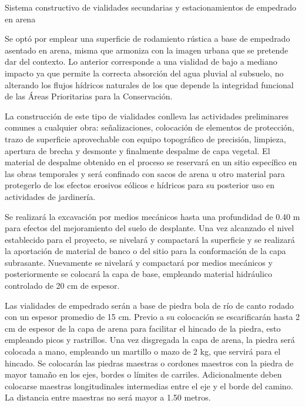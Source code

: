 \documentclass{article}
\begin{document}
\bigskip


\bigskip

Sistema constructivo de vialidades secundarias y estacionamientos de empedrado en arena


\bigskip

Se optó por emplear una superficie de rodamiento rústica a base de empedrado asentado en arena, misma que armoniza con la imagen urbana que se pretende dar del contexto. Lo anterior corresponde a una vialidad de bajo a mediano impacto ya que permite la correcta absorción del agua pluvial al subsuelo, no alterando los flujos hídricos naturales de los que depende la integridad funcional de las Áreas Prioritarias para la Conservación. 


\bigskip

La construcción de este tipo de vialidades conlleva las actividades preliminares comunes a cualquier obra: señalizaciones, colocación de elementos de protección, trazo de superficie aprovechable con equipo topográfico de precisión, limpieza, apertura de brecha y desmonte y finalmente despalme de capa vegetal. El material de despalme obtenido en el proceso se reservará en un sitio específico en las obras temporales y será confinado con sacos de arena u otro material para protegerlo de los efectos erosivos eólicos e hídricos para su posterior uso en actividades de jardinería.


\bigskip

Se realizará la excavación por medios mecánicos hasta una profundidad de 0.40 m para efectos del mejoramiento del suelo de desplante. Una vez alcanzado el nivel establecido para el proyecto, se nivelará y compactará la superficie y se realizará la aportación de material de banco o del sitio para la conformación de la capa subrasante. Nuevamente se nivelará y compactará por medios mecánicos y posteriormente se colocará la capa de base, empleando material hidráulico controlado de 20 cm de espesor.


\bigskip

Las vialidades de empedrado serán a base de piedra bola de río de canto rodado con un espesor promedio de 15 cm. Previo a su colocación se escarificarán hasta 2 cm de espesor de la capa de arena para facilitar el hincado de la piedra, esto empleando picos y rastrillos. Una vez disgregada la capa de arena, la piedra será colocada a mano, empleando un martillo o mazo de 2 kg, que servirá para el hincado. Se colocarán las piedras maestras o cordones maestros con la piedra de mayor tamaño en los ejes, bordes o límites de carriles. Adicionalmente deben colocarse maestras longitudinales intermedias entre el eje y el borde del camino. La distancia entre maestras no será mayor a 1.50 metros. 
\end{document}
